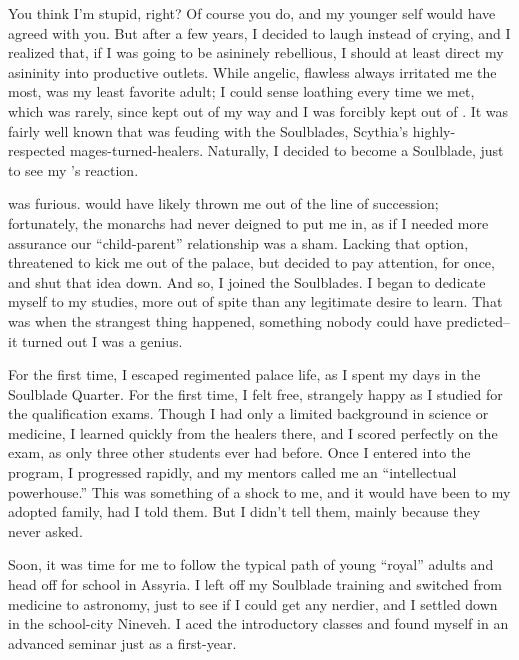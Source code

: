 \documentclass[char]{Kos}
\begin{document}
You think I'm stupid, right? Of course you do, and my younger self would have agreed with you. But after a few years, I decided to laugh instead of crying, and I realized that, if I was going to be asininely rebellious, I should at least direct my asininity into productive outlets. While angelic, flawless \cBride{} always irritated me the most, \cBride{\their} \cScythiaQueen{\parent} \cScythiaQueen{} was my least favorite adult; I could sense \cScythiaQueen{\their} loathing every time we met, which was rarely, since \cScythiaQueen{\they} kept out of my way and I was forcibly kept out of \cScythiaQueen{\theirs}. It was fairly well known that \cScythiaQueen{\they} was feuding with the Soulblades, Scythia's highly-respected mages-turned-healers. Naturally, I decided to become a Soulblade, just to see my \cScythiaQueen{\parent}'s reaction.

\cScythiaQueen{\They} was furious. \cScythiaQueen{\They} would have likely thrown me out of the line of succession; fortunately, the monarchs had never deigned to put me in, as if I needed more assurance our ``child-parent'' relationship was a sham. Lacking that option, \cScythiaQueen{\they} threatened to kick me out of the palace, but \cScythiaQueen{\their} \cScythiaKing{\spouse} decided to pay attention, for once, and shut that idea down. And so, I joined the Soulblades. I began to dedicate myself to my studies, more out of spite than any legitimate desire to learn. That was when the strangest thing happened, something nobody could have predicted-- it turned out I was a genius.

For the first time, I escaped regimented palace life, as I spent my days in the Soulblade Quarter. For the first time, I felt free, strangely happy as I studied for the qualification exams. Though I had only a limited background in science or medicine, I learned quickly from the healers there, and I scored perfectly on the exam, as only three other students ever had before. Once I entered into the program, I progressed rapidly, and my mentors called me an ``intellectual powerhouse.'' This was something of a shock to me, and it would have been to my adopted family, had I told them. But I didn't tell them, mainly because they never asked.

Soon, it was time for me to follow the typical path of young ``royal'' adults and head off for school in Assyria. I left off my Soulblade training and switched from medicine to astronomy, just to see if I could get any nerdier, and I settled down in the school-city Nineveh. I aced the introductory classes and found myself in an advanced seminar just as a first-year. 
\end{document}
